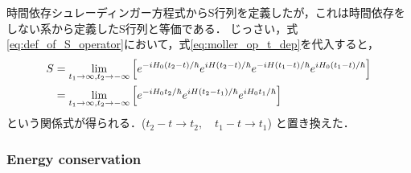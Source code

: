 \documentclass[a4paper,11pt]{ltjsarticle}
\numberwithin{equation}{section}
\begin{document}
時間依存シュレーディンガー方程式からS行列を定義したが，これは時間依存をしない系から定義したS行列と等価である．
じっさい，式\ref{eq:def_of_S_operator}において，式\ref{eq:moller_op_t_dep}を代入すると，
\begin{align}
  S 
  &= \lim_{t_1 \rightarrow \infty , t_2 \rightarrow -\infty} \qty[e^{-iH_0(t_2 - t)/\hbar} e^{iH(t_2 - t)/ \hbar} e^{-iH(t_1 -t)/\hbar} e^{iH_0(t_1 - t)/\hbar}] \notag \\
  &= \lim_{t_1 \rightarrow \infty , t_2 \rightarrow -\infty} \qty[e^{-iH_0t_2/\hbar} e^{iH(t_2 -t_1 )/ \hbar} e^{iH_0t_1 /\hbar}] \notag
\end{align}
という関係式が得られる．($t_2 -t \rightarrow t_2, \quad t_1- t \rightarrow t_1 $)
と置き換えた．

\subsubsection{Energy conservation}

















\newpage
% 
% 
\printbibliography%
\end{document}
